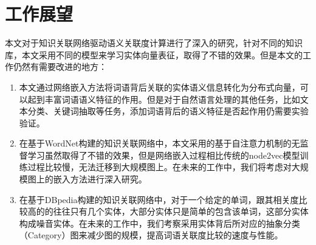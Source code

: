 \section{工作展望}
本文对于知识关联网络驱动语义关联度计算进行了深入的研究，针对不同的知识库，本文采用不同的模型来学习实体向量表征，取得了不错的效果。但是本文的工作仍然有需要改进的地方：
\begin{enumerate}
    \item 本文通过网络嵌入方法将词语背后关联的实体语义信息转化为分布式向量，可以起到丰富词语语义特征的作用。但是对于自然语言处理的其他任务，比如文本分类、关键词抽取等任务，添加词语背后的语义特征是否起作用仍需要实验验证。
    \item 在基于WordNet构建的知识关联网络中，本文采用的基于自注意力机制的无监督学习虽然取得了不错的效果，但是网络嵌入过程相比传统的node2vec模型训练过程比较慢，无法迁移到大规模图上。在未来的工作中，我们将考虑对大规模图上的嵌入方法进行深入研究。
    \item 在基于DBpedia构建的知识关联网络中，对于一个给定的单词，跟其相关度比较高的的往往只有几个实体，大部分实体只是简单的包含该单词，这部分实体构成噪音实体。在未来的工作中，我们考察采用实体背后所对应的抽象分类（Category）图来减少图的规模，提高词语关联度比较的速度与性能。
\end{enumerate}
